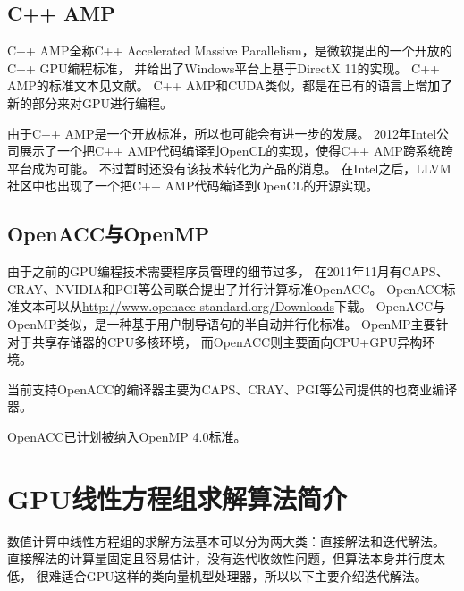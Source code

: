 \subsection{C++ AMP}

C++ AMP全称C++ Accelerated Massive Parallelism，是微软提出的一个开放的C++ GPU编程标准，
并给出了Windows平台上基于DirectX 11的实现。
C++ AMP的标准文本见文献。
C++ AMP和CUDA类似，都是在已有的语言上增加了新的部分来对GPU进行编程。
\cite{cppamp-overview,AdeGTC2013}

由于C++ AMP是一个开放标准，所以也可能会有进一步的发展。
2012年Intel公司展示了一个把C++ AMP代码编译到OpenCL的实现，使得C++ AMP跨系统跨平台成为可能。
\cite{cppamp-opencl}
不过暂时还没有该技术转化为产品的消息。
在Intel之后，LLVM社区中也出现了一个把C++ AMP代码编译到OpenCL的开源实现\cite{llvm-amp-opencl-prototype}。


\subsection{OpenACC与OpenMP}

由于之前的GPU编程技术需要程序员管理的细节过多，
在2011年11月有CAPS、CRAY、NVIDIA和PGI等公司联合提出了并行计算标准OpenACC。
\cite{reyes2012comparative}
OpenACC标准文本可以从\url{http://www.openacc-standard.org/Downloads}下载。
OpenACC与OpenMP类似，是一种基于用户制导语句的半自动并行化标准。
OpenMP主要针对于共享存储器的CPU多核环境，
而OpenACC则主要面向CPU+GPU异构环境。

当前支持OpenACC的编译器主要为CAPS、CRAY、PGI等公司提供的也商业编译器。

OpenACC已计划被纳入OpenMP 4.0标准。\cite{beyer2011openmp}



\section{GPU线性方程组求解算法简介}

数值计算中线性方程组的求解方法基本可以分为两大类：直接解法和迭代解法。
直接解法的计算量固定且容易估计，没有迭代收敛性问题，但算法本身并行度太低，
很难适合GPU这样的类向量机型处理器，所以以下主要介绍迭代解法。

